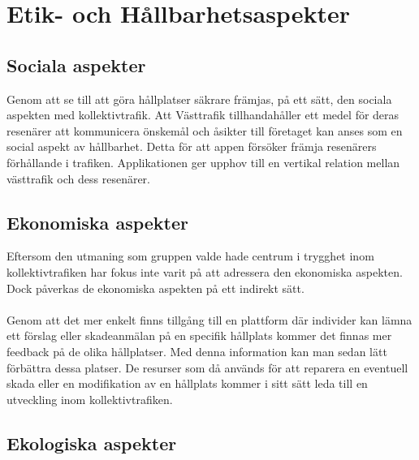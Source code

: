 \documentclass{article}
\begin{document}
\section*{Etik- och Hållbarhetsaspekter}
\subsection*{Sociala aspekter}
Genom att se till att göra hållplatser säkrare främjas, på ett sätt, den sociala aspekten med kollektivtrafik. Att Västtrafik tillhandahåller ett medel för deras resenärer att kommunicera önskemål och åsikter till företaget kan anses som en social aspekt av hållbarhet. Detta för att appen försöker främja resenärers förhållande i trafiken. Applikationen ger upphov till en vertikal relation mellan västtrafik och dess resenärer.

\subsection*{Ekonomiska aspekter}
Eftersom den utmaning som gruppen valde hade centrum i trygghet inom kollektivtrafiken har fokus inte varit på att adressera den ekonomiska aspekten. Dock påverkas de ekonomiska aspekten på ett indirekt sätt. 
\\\\
Genom att det mer enkelt finns tillgång till en plattform där individer kan lämna ett förslag eller skadeanmälan på en specifik hållplats kommer det finnas mer feedback på de olika hållplatser. Med denna information kan man sedan lätt förbättra dessa platser. De resurser som då används för att reparera en eventuell skada eller en modifikation av en hållplats kommer i sitt sätt leda till en utveckling inom kollektivtrafiken.
\subsection*{Ekologiska aspekter}
\end{document}
